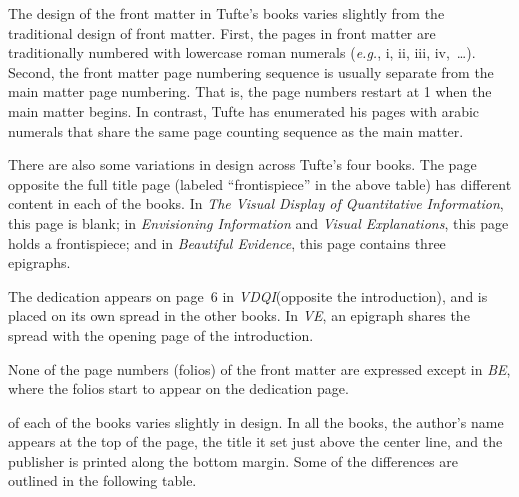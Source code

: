 \documentclass{tufte-book}
\newcommand{\vdqi}{\textit{VDQI}\xspace}
\newcommand{\ve}{\textit{VE}\xspace}
\newcommand{\be}{\textit{BE}\xspace}
\newcommand{\VDQI}{\textit{The Visual Display of Quantitative Information}\xspace}
\newcommand{\EI}{\textit{Envisioning Information}\xspace}
\newcommand{\VE}{\textit{Visual Explanations}\xspace}
\newcommand{\BE}{\textit{Beautiful Evidence}\xspace}
\newcommand{\hairsp}{\hspace{1pt}}%
\newcommand{\eg}{\textit{e.\hairsp{}g.}\xspace}
\begin{document}
\bigskip
The design of the front matter in Tufte's books varies slightly from the
traditional design of front matter.  First, the pages in front matter are
traditionally numbered with lowercase roman numerals (\eg, i, ii, iii,
iv,~\ldots).  Second, the front matter page numbering sequence is usually
separate from the main matter page numbering.  That is, the page numbers
restart at 1 when the main matter begins.  In contrast, Tufte has
enumerated his pages with arabic numerals that share the same page counting
sequence as the main matter.  

There are also some variations in design across Tufte's four books.  The
page opposite the full title page (labeled ``frontispiece'' in the above
table) has different content in each of the books.  In \VDQI, this page is
blank; in \EI and \VE, this page holds a frontispiece; and in \BE, this
page contains three epigraphs.

The dedication appears on page~6 in \vdqi (opposite the introduction), and
is placed on its own spread in the other books.  In \ve, an epigraph shares
the spread with the opening page of the introduction.

None of the page numbers (folios) of the front matter are expressed except in
\be, where the folios start to appear on the dedication page.

 of each of the books varies slightly in
design.  In all the books, the author's name appears at the top of the
page, the title it set just above the center line, and the publisher is
printed along the bottom margin.  Some of the differences are outlined in
the following table.
\end{document}
